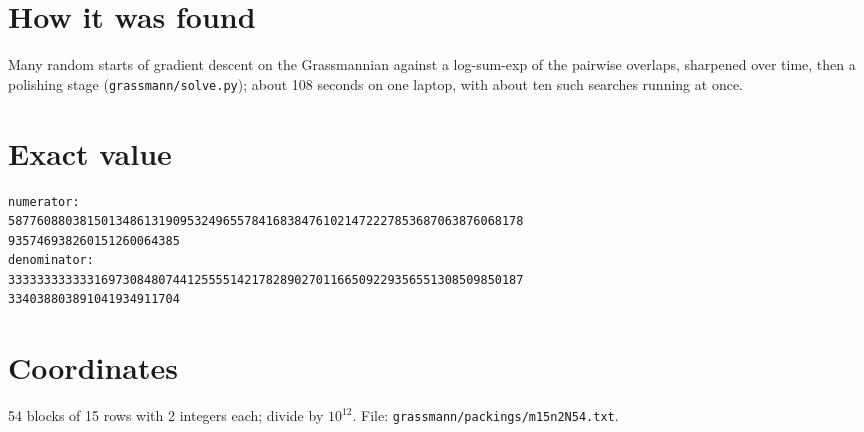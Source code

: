 \documentclass[11pt,a4paper]{article}
\begin{document}
\section{How it was found}
Many random starts of gradient descent on the Grassmannian against a log-sum-exp of the pairwise overlaps, sharpened over time, then a polishing stage (\texttt{grassmann/solve.py}); about 108 seconds on one laptop, with about ten such searches running at once.


\appendix
\section{Exact value}
{\small
\begin{verbatim}
numerator:
587760880381501348613190953249655784168384761021472227853687063876068178
935746938260151260064385
denominator:
333333333333169730848074412555514217828902701166509229356551308509850187
334038803891041934911704
\end{verbatim}}

\section{Coordinates}
54 blocks of 15 rows with 2 integers each; divide by $10^{12}$. File: \texttt{grassmann/packings/m15n2N54.txt}.
{\tiny
\begin{multicols}{4}
\end{multicols}}
\end{document}
